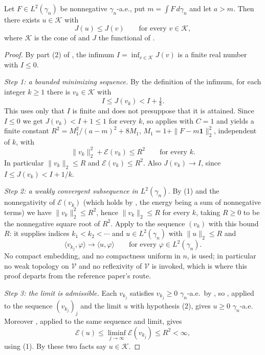 \begin{lemma}
Let $F \in L^2(\gamma_n)$ be nonnegative $\gamma_n$-a.e., put
$m = \int F \, d\gamma_n$ and let $a > m$.  Then there exists
$u \in \mathcal{K}$ with
\[
  J(u) \leq J(v) \qquad\text{for every } v \in \mathcal{K},
\]
where $\mathcal{K}$ is the cone of  and $J$ the functional
of .
\end{lemma}
\begin{proof}
By part (2) of , the infimum
$I = \inf_{v \in \mathcal{K}} J(v)$ is a finite real number with $I \leq 0$.

\emph{Step 1: a bounded minimizing sequence.}
By the definition of the infimum, for each integer $k \geq 1$ there is
$v_k \in \mathcal{K}$ with
\[
  I \leq J(v_k) < I + \tfrac1k .
\]
This uses only that $I$ is finite and does not presuppose that it is attained.
Since $I \leq 0$ we get $J(v_k) < I + 1 \leq 1$ for every $k$, so
 applies with $C = 1$ and yields a finite
constant
$R^2 = M_1^2/(a-m)^2 + 8M_1$, $M_1 = 1 + \|F - m\mathbf{1}\|_2^2$, independent of
$k$, with
\begin{equation*}
  \|v_k\|_2^2 + \mathcal{E}(v_k) \leq R^2 \qquad\text{for every } k . \tag{1}
\end{equation*}
In particular $\|v_k\|_2 \leq R$ and $\mathcal{E}(v_k) \leq R^2$.  Also
$J(v_k) \to I$, since $I \leq J(v_k) < I + 1/k$.

\emph{Step 2: a weakly convergent subsequence in $L^2(\gamma_n)$.}
By (1) and the nonnegativity of $\mathcal{E}(v_k)$ (which holds by
, the energy being a sum of nonnegative terms) we have
$\|v_k\|_2^2 \leq R^2$, hence $\|v_k\|_2 \leq R$ for every $k$, taking $R \geq 0$
to be the nonnegative square root of $R^2$.  Apply
 to the sequence $(v_k)$ with this bound $R$: it
supplies indices $k_1 < k_2 < \cdots$ and $u \in L^2(\gamma_n)$ with
$\|u\|_2 \leq R$ and
\begin{equation*}
  \langle v_{k_j}, \varphi\rangle \longrightarrow \langle u, \varphi\rangle
  \qquad\text{for every } \varphi \in L^2(\gamma_n). \tag{2}
\end{equation*}
No compact embedding, and no compactness uniform in $n$, is used; in particular
no weak topology on $\mathcal{V}$ and no reflexivity of $\mathcal{V}$ is
invoked, which is where this proof departs from the reference paper's route.

\emph{Step 3: the limit is admissible.}
Each $v_{k_j}$ satisfies $v_{k_j} \geq 0$ $\gamma_n$-a.e.\ by
, so , applied to the sequence
$(v_{k_j})_j$ and the limit $u$ with hypothesis (2), gives $u \geq 0$
$\gamma_n$-a.e.  Moreover , applied to the same
sequence and limit, gives
\begin{equation*}
  \mathcal{E}(u) \leq \liminf_{j\to\infty} \mathcal{E}(v_{k_j}) \leq R^2 < \infty,
  \tag{3}
\end{equation*}
using (1).  By  these two facts say $u \in \mathcal{K}$.


\end{proof}
